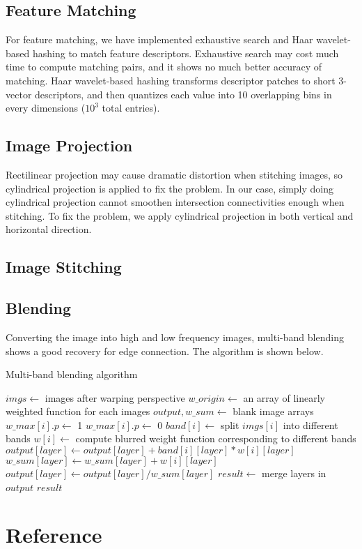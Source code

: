\documentclass[11pt]{article}
\begin{document}
\subsection{Feature Matching}
For feature matching, we have implemented exhaustive search and  Haar wavelet-based hashing to match feature descriptors. Exhaustive search may cost much time to compute matching pairs, and it shows no much better accuracy of matching. Haar wavelet-based hashing transforms descriptor patches to short 3-vector descriptors, and then quantizes each value into 10 overlapping bins in every dimensions ($10^3$ total entries).

\subsection{Image Projection}
Rectilinear projection may cause dramatic distortion when stitching images, so cylindrical projection is applied to fix the problem. In our case, simply doing cylindrical projection cannot smoothen intersection connectivities enough when stitching. To fix the problem, we apply cylindrical projection in both vertical and horizontal direction.

\subsection{Image Stitching}

\subsection{Blending}
Converting the image into high and low frequency images, multi-band blending shows a good recovery for edge connection. The algorithm is shown below.

\begin{algorithm}
\caption{Multi-band blending algorithm}
\begin{algorithmic}
\State $imgs\gets$ images after warping perspective
  \State $w\_origin\gets$ an array of linearly weighted function for each images
  \State $output, w\_sum\gets$ blank image arrays
      \State $w\_max[i].p\gets$ 1
      \Else
      \State $w\_max[i].p\gets$ 0
      \EndIf
    \EndFor
    \State $band[i]\gets$ split $imgs[i]$ into different bands
    \State $w[i]\gets$ compute blurred weight function corresponding to different bands
  \EndFor
      \State $output[layer]\gets output[layer]+band[i][layer]*w[i][layer]$
      \State $w\_sum[layer]\gets w\_sum[layer]+w[i][layer]$
    \EndFor
    \State $output[layer]\gets output[layer]/w\_sum[layer]$
  \EndFor
  \State $result\gets$ merge layers in $output$
  \State \Return $result$
\EndFunction
\end{algorithmic}
\end{algorithm}


\section{Reference}


\end{document}
